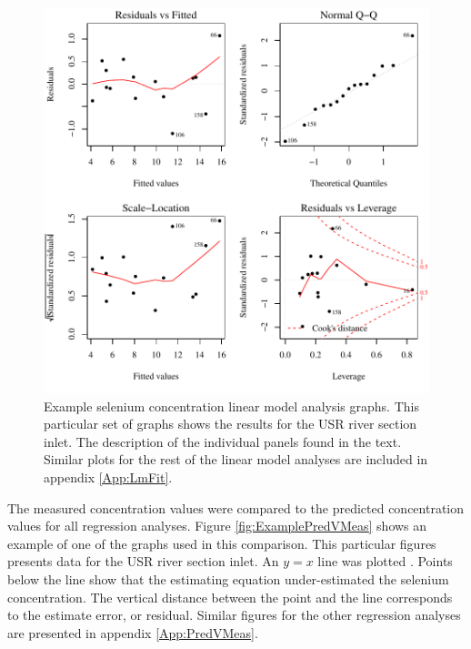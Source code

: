 \begin{linenumbers}
\begin{figure}[htbp]
	\begin{center}
		\includegraphics[width=6in]{"Figures/Results_USR/Conc Model lm-fit U163"}
		\caption[Example selenium concentration linear model analysis graphs.]{Example selenium concentration linear model analysis graphs.  This particular set of graphs shows the results for the USR river section inlet.  The description of the individual panels found in the text.  Similar plots for the rest of the linear model analyses are included in appendix \ref{App:LmFit}.}
	\label{fig:ExampleLmFit}
	\end{center}
\end{figure}

The measured concentration values were compared to the predicted concentration values for all regression analyses.  Figure \ref{fig:ExamplePredVMeas} shows an example of one of the graphs used in this comparison.  This particular figures presents data for the USR river section inlet.  An $y=x$ line was plotted .  Points below the line show that the estimating equation under-estimated the selenium concentration.  The vertical distance between the point and the line corresponds to the estimate error, or residual.  Similar figures for the other regression analyses are presented in appendix \ref{App:PredVMeas}.


\end{linenumbers}
